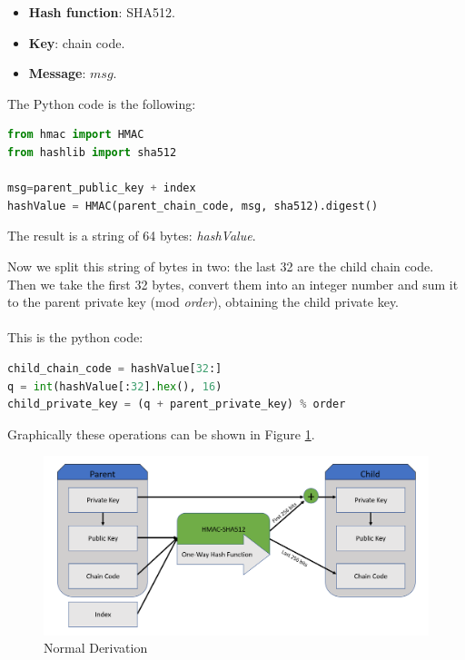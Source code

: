 \begin{itemize}[label=$\odot$]
	\item \textbf{Hash function}: SHA512.
	\item \textbf{Key}: chain code.
	\item \textbf{Message}: $msg$.
\end{itemize}
The Python code is the following:
\begin{lstlisting}[language=Python]
from hmac import HMAC
from hashlib import sha512

msg=parent_public_key + index
hashValue = HMAC(parent_chain_code, msg, sha512).digest()
\end{lstlisting}
\begin{flushleft}
	The result is a string of 64 bytes: \textit{hashValue}.
\end{flushleft}
Now we split this string of bytes in two: the last 32 are the child chain code. Then we take the first 32 bytes, convert them into an integer number and sum it to the parent private key (mod \textit{order}), obtaining the child private key.\\ \\
This is the python code:

\begin{lstlisting}[language=Python]
child_chain_code = hashValue[32:]
q = int(hashValue[:32].hex(), 16)
child_private_key = (q + parent_private_key) % order
\end{lstlisting}

\begin{flushleft}
	Graphically these operations can be shown in Figure \ref{fig:normal_derivation}.
\end{flushleft}

\begin{figure}[ht!]
	\centering
	\includegraphics[width=14.5cm]{Figures/normal_derivation_v2.png}
	\caption{Normal Derivation }
	\label{fig:normal_derivation}
\end{figure}


